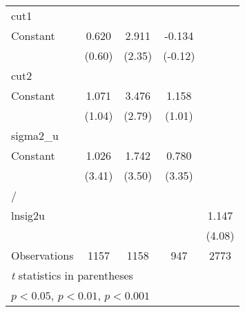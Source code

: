 {\begin{tabular}{l*{4}{c}}
\hline
cut1                &                     &                     &                     &                     \\
Constant            &       0.620         &       2.911\sym{*}  &      -0.134         &                     \\
                    &      (0.60)         &      (2.35)         &     (-0.12)         &                     \\
\hline
cut2                &                     &                     &                     &                     \\
Constant            &       1.071         &       3.476\sym{**} &       1.158         &                     \\
                    &      (1.04)         &      (2.79)         &      (1.01)         &                     \\
\hline
sigma2\_u            &                     &                     &                     &                     \\
Constant            &       1.026\sym{***}&       1.742\sym{***}&       0.780\sym{***}&                     \\
                    &      (3.41)         &      (3.50)         &      (3.35)         &                     \\
\hline
/                   &                     &                     &                     &                     \\
lnsig2u             &                     &                     &                     &       1.147\sym{***}\\
                    &                     &                     &                     &      (4.08)         \\
\hline
Observations        &        1157         &        1158         &         947         &        2773         \\
\hline\hline
\multicolumn{5}{l}{\footnotesize \textit{t} statistics in parentheses}\\
\multicolumn{5}{l}{\footnotesize \sym{*} \(p<0.05\), \sym{**} \(p<0.01\), \sym{***} \(p<0.001\)}\\
\end{tabular}
}
